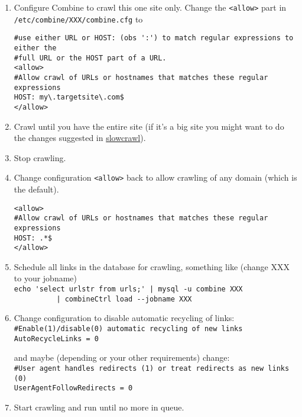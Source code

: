 \begin{enumerate}
\item Configure Combine to crawl this one site only.
Change the {\tt <allow>} part in\\
{\tt /etc/combine/XXX/combine.cfg} to
\begin{verbatim}
#use either URL or HOST: (obs ':') to match regular expressions to either the
#full URL or the HOST part of a URL.
<allow>
#Allow crawl of URLs or hostnames that matches these regular expressions
HOST: my\.targetsite\.com$
</allow>
\end{verbatim}

\item Crawl until you have the entire site (if it's a big site you might want to do the changes
suggested in \hyperref{FAQ no \ref{slowcrawl}}{FAQ no }{}{slowcrawl}).

\item Stop crawling.

\item Change configuration {\tt <allow>} back to allow crawling
of any domain (which is the default).
\begin{verbatim}
<allow>
#Allow crawl of URLs or hostnames that matches these regular expressions
HOST: .*$
</allow>
\end{verbatim}

\item Schedule all links in the database for crawling, something like (change XXX to your jobname)\\
\verb+echo 'select urlstr from urls;' | mysql -u combine XXX+\\
\verb+          | combineCtrl load --jobname XXX+

\item Change configuration to disable automatic recycling of links:\\
\verb+#Enable(1)/disable(0) automatic recycling of new links+\\
\verb+AutoRecycleLinks = 0+

and maybe (depending or your other requirements) change:\\
\verb+#User agent handles redirects (1) or treat redirects as new links (0)+\\
\verb+UserAgentFollowRedirects = 0+

\item Start crawling and run until no more in queue.
\end{enumerate}
